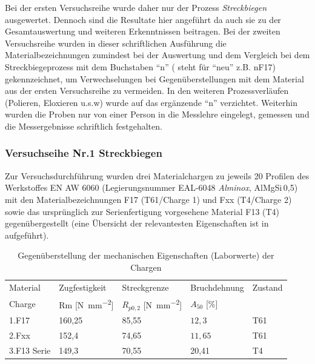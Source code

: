 \documentclass[12pt,a4paper,parskip]{scrartcl}
\begin{document}
Bei der ersten Versuchsreihe wurde daher nur der Prozess \emph{Streckbiegen} ausgewertet. Dennoch sind die Resultate hier angeführt da auch sie zu der Gesamtauswertung und weiteren Erkenntnissen beitragen. Bei der zweiten Versuchsreihe wurden in dieser schriftlichen Ausführung die Materialbezeichnungen zumindest bei der Auswertung und dem Vergleich bei dem Streckbiegeprozess mit dem Buchstaben "`n"' ( steht für "`neu"' z.B. nF17) gekennzeichnet, um Verwechselungen bei Gegenüberstellungen mit dem Material aus der ersten Versuchsreihe zu vermeiden. In den weiteren Prozessverläufen (Polieren, Eloxieren u.s.w) wurde auf das ergänzende "`n"' verzichtet. Weiterhin wurden die Proben nur von einer Person in die Messlehre eingelegt, gemessen und die Messergebnisse schriftlich festgehalten.	 	


\subsubsection{Versuchseihe Nr.1 Streckbiegen}
Zur Versuchsdurchführung wurden drei Materialchargen zu jeweils 20 Profilen des Werkstoffes EN AW 6060 (Legierungsnummer EAL-6048 \emph{Alminox}, AlMgSi\,0,5) mit den Materialbezeichnungen F17 (T61/Charge 1) und Fxx (T4/Charge 2) sowie das ursprünglich zur Serienfertigung vorgesehene Material F13 (T4)  gegenübergestellt (eine Übersicht der relevantesten Eigenschaften ist in  aufgeführt).
\begin{table}[hbtp]
\caption{Gegenüberstellung der mechanischen Eigenschaften (Laborwerte) der Chargen}
\label{tab:chargeneigenschaften}
\centering
\begin{tabular}{lllll}
\toprule
Material & Zugfestigkeit & Streckgrenze & Bruchdehnung & Zustand \\
Charge &  Rm [\si{\newton\per\milli\meter\squared}] &  $R_{p0,2}$ [\si{\newton\per\milli\meter\squared}] &  $A_{50}$ [\%] & \\
\midrule
1.F17 & 160,25 & 85,55 & $ 12,3 $ & T61 \\
2.Fxx & 152,4 & 74,65 &  $ 11,65 $ & T61 \\
3.F13 Serie & 149,3 & 70,55 & 20,41  & T4 \\
\bottomrule




\end{tabular}
\end{table}
\end{document}

